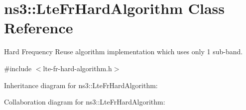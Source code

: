 \hypertarget{classns3_1_1LteFrHardAlgorithm}{}\section{ns3\+:\+:Lte\+Fr\+Hard\+Algorithm Class Reference}
\label{classns3_1_1LteFrHardAlgorithm}


Hard Frequency Reuse algorithm implementation which uses only 1 sub-\/band.  




{\ttfamily \#include $<$lte-\/fr-\/hard-\/algorithm.\+h$>$}



Inheritance diagram for ns3\+:\+:Lte\+Fr\+Hard\+Algorithm\+:


Collaboration diagram for ns3\+:\+:Lte\+Fr\+Hard\+Algorithm\+:

